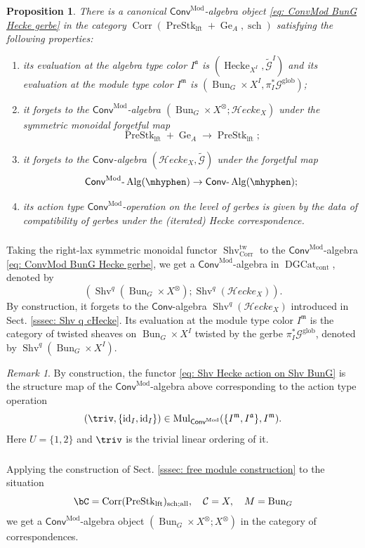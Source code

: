 \documentclass[10pt]{amsart}
\newcommand{\sssec}{\subsubsection}
\newtheorem{prop}[subsubsection]{Proposition}
\theoremstyle{remark}
\newtheorem{rmk}[subsubsection]{Remark}
\newcommand{\mf}[1]{\mathfrak{#1}}
\newcommand{\wt}{\widetilde}
\newcommand{\on}{\operatorname}
\newcommand{\cC}{\mathcal{C}}
\newcommand{\cG}{\mathcal{G}}
\newcommand{\DGcat}{\on{DGCat}_{\on{cont}}}
\newcommand{\lAlg}{\text{-}\on{Alg}}
\newcommand{\Shv}{\on{Shv}}
\newcommand{\PreStklft}{\on{PreStk}_{\on{lft}}}
\newcommand{\id}{\on{id}}
\newcommand{\Hecke}{\on{Hecke}}
\newcommand{\Bun}{\on{Bun}}
\newcommand{\Mul}{\on{Mul}}
\newcommand{\Conv}{\mathsf{Conv}}
\newcommand{\ConvMod}{\mathsf{Conv}^{\on{Mod}}}
\newcommand{\cHecke}{\mathcal{H}ecke}
\newcommand{\Corr}{\on{Corr}}
\begin{document}
\begin{prop}
    There is a canonical $\ConvMod$-algebra object \eqref{eq: ConvMod BunG Hecke gerbe} in the category $\Corr(\PreStklft+\on{Ge}_A,\on{sch})$ satisfying the following properties:
    \begin{enumerate}
        \item its evaluation at the algebra type color $I^{\mf{a}}$ is $(\Hecke_{X^I},\wt{\cG}^I)$ and its evaluation at the module type color $I^{\mf{m}}$ is $(\Bun_G\times X^I,\pi^*_I\cG^{\on{glob}})$;
        \item it forgets to the $\ConvMod$-algebra $(\Bun_G\times X^{\otimes}; \cHecke_{X})$ under the symmetric monoidal forgetful map \[\PreStklft+\on{Ge}_A\rightarrow \PreStklft;\]
        \item it forgets to the $\Conv$-algebra $(\cHecke_X, \wt{\cG})$ under the forgetful map
        \[\ConvMod\lAlg(\mhyphen)\rightarrow \Conv\lAlg(\mhyphen);\]
        \item its action type $\ConvMod$-operation on the level of gerbes is given by the data of compatibility of gerbes under the (iterated) Hecke correspondence.
    \end{enumerate}
\end{prop}

\sssec{}
Taking the right-lax symmetric monoidal functor $\Shv^{\on{tw}}_{\Corr}$ to the $\ConvMod$-algebra \eqref{eq: ConvMod BunG Hecke gerbe}, we get a $\ConvMod$-algebra in $\DGcat$, denoted by \[\left(\Shv^q(\Bun_G\times X^{\otimes}); \Shv^q(\cHecke_{X})\right).\] By construction, it forgets to the $\Conv$-algebra $\Shv^q(\cHecke_{X})$ introduced in Sect. \ref{sssec: Shv q cHecke}. Its evaluation at the module type color $I^{\mf{m}}$ is the category of twisted sheaves on $\Bun_G\times X^I$ twisted by the gerbe $\pi_I^*\cG^{\on{glob}}$, denoted by
$\Shv^q(\Bun_G\times X^I)$.

\begin{rmk}
    By construction, the functor \eqref{eq: Shv Hecke action on Shv BunG} is the structure map of the $\ConvMod$-algebra above corresponding to the action type operation \[(\triv, \{\id_I,\id_I\})\in \Mul_{\ConvMod}(\{I^{\mf{m}},I^{\mf{a}}\}, I^{\mf{m}}).\]
    Here $U=\{1,2\}$ and $\triv$ is the trivial linear ordering of it.
\end{rmk}

\sssec{}
Applying the construction of Sect. \ref{sssec: free module construction} to the situation
\[\bC=\Corr(\PreStklft)_{\on{sch};\on{all}},\quad \cC=X, \quad M=\Bun_G\]
we get a $\ConvMod$-algebra object $(\Bun_G\times X^{\otimes}; X^{\otimes})$ in the category of correspondences. 
\medskip
\end{document}
